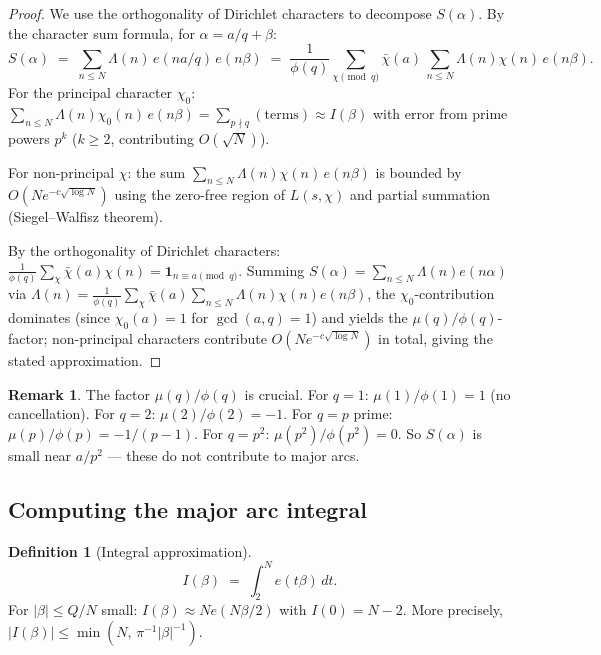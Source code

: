 \documentclass[12pt,a4paper]{amsart}
\theoremstyle{definition}
\newtheorem{definition}[theorem]{Definition}
\newtheorem{remark}[theorem]{Remark}
\newcommand{\eq}[1]{e\!\left(#1\right)}
\begin{document}
\begin{proof}
  We use the orthogonality of Dirichlet characters to decompose $S(\alpha)$.
  By the character sum formula, for $\alpha = a/q + \beta$:
  \[
    S(\alpha) \;=\; \sum_{n \leq N} \Lambda(n)\, \eq{na/q}\, \eq{n\beta}
    \;=\; \frac{1}{\phi(q)} \sum_{\chi \pmod q}
          \bar\chi(a)\, \sum_{n \leq N} \Lambda(n)\chi(n)\, \eq{n\beta}.
  \]
  For the principal character $\chi_0$:
  $\sum_{n \leq N} \Lambda(n)\chi_0(n)\, \eq{n\beta}
  = \sum_{p \nmid q} (\text{terms}) \approx I(\beta)$
  with error from prime powers $p^k$ ($k \geq 2$, contributing $O(\sqrt{N})$).

  For non-principal $\chi$: the sum $\sum_{n \leq N} \Lambda(n)\chi(n)\, \eq{n\beta}$
  is bounded by $O(N e^{-c\sqrt{\log N}})$ using the zero-free region of
  $L(s, \chi)$ and partial summation (Siegel--Walfisz theorem).

  By the orthogonality of Dirichlet characters:
  $\frac{1}{\phi(q)}\sum_\chi \bar\chi(a)\chi(n) = \mathbf{1}_{n \equiv a \pmod q}$.
  Summing $S(\alpha) = \sum_{n \leq N}\Lambda(n)\eq{n\alpha}$ via
  $\Lambda(n) = \frac{1}{\phi(q)}\sum_\chi \bar\chi(a)\sum_{n\leq N}\Lambda(n)\chi(n)\eq{n\beta}$,
  the $\chi_0$-contribution dominates (since $\chi_0(a)=1$ for $\gcd(a,q)=1$)
  and yields the $\mu(q)/\phi(q)$-factor; non-principal characters contribute
  $O(Ne^{-c\sqrt{\log N}})$ in total, giving the stated approximation.
\end{proof}

\begin{remark}
  The factor $\mu(q)/\phi(q)$ is crucial.  For $q = 1$: $\mu(1)/\phi(1) = 1$
  (no cancellation).  For $q = 2$: $\mu(2)/\phi(2) = -1$.  For $q = p$ prime:
  $\mu(p)/\phi(p) = -1/(p-1)$.  For $q = p^2$: $\mu(p^2)/\phi(p^2) = 0$.
  So $S(\alpha)$ is small near $a/p^2$ — these do not contribute to major arcs.
\end{remark}

\subsection{Computing the major arc integral}

\begin{definition}[Integral approximation]
  \[
    I(\beta) \;=\; \int_2^N \eq{t\beta}\, dt.
  \]
  For $|\beta| \leq Q/N$ small: $I(\beta) \approx N \eq{N\beta/2}$ with
  $I(0) = N - 2$.  More precisely, $|I(\beta)| \leq \min(N,\, \pi^{-1}|\beta|^{-1})$.
\end{definition}
\end{document}
